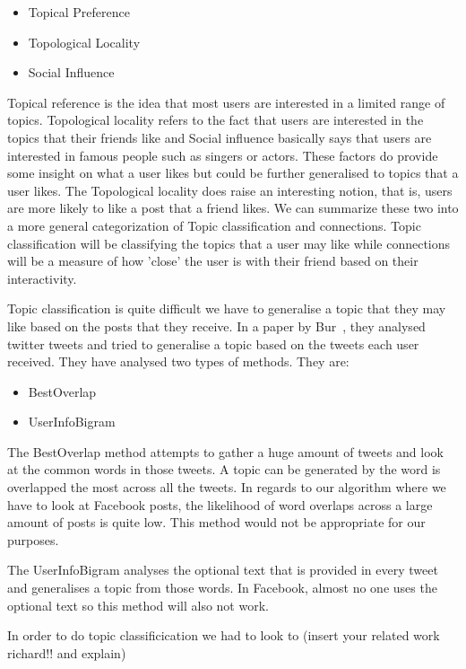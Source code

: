 \begin{itemize}
 \item Topical Preference
 \item Topological Locality
 \item Social Influence
\end{itemize}

Topical reference is the idea that most users are interested in a limited range of topics. Topological locality refers to the fact that users are interested in the topics that their friends like and Social influence basically says that users are interested in famous people such as singers or actors. These factors do provide some insight on what a user likes but could be further generalised to topics that a user likes. The Topological locality does raise an interesting notion, that is, users are more likely to like a post that a friend likes. We can summarize these two into a more general categorization of Topic classification and connections. Topic classification will be classifying the topics that a user may like while connections will be a measure of how 'close' the user is with their friend based on their interactivity. 

Topic classification is quite difficult we have to generalise a topic that they may like based on the posts that they receive. In a paper by Bur~\cite{Bur2013}, they analysed twitter tweets and tried to generalise a topic based on the tweets each user received. They have analysed two types of methods. They are:

\begin{itemize}
 \item BestOverlap
 \item UserInfoBigram
\end{itemize}

The BestOverlap method attempts to gather a huge amount of tweets and look at the common words in those tweets. A topic can be generated by the word is overlapped the most across all the tweets. In regards to our algorithm where we have to look at Facebook posts, the likelihood of word overlaps across a large amount of posts is quite low. This method would not be appropriate for our purposes.

The UserInfoBigram analyses the optional text that is provided in every tweet and generalises a topic from those words. In Facebook, almost no one uses the optional text so this method will also not work.

In order to do topic classificication we had to look to (insert your related work richard!! and explain)

